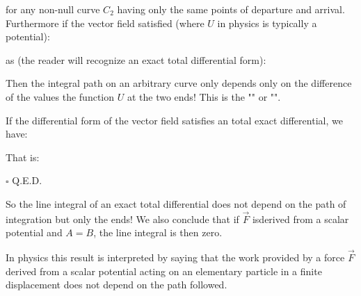 	for any non-null curve $C_2$ having only the same points of departure and arrival. Furthermore if the vector field satisfied (where $U$ in physics is typically a potential):
	
	as (the reader will recognize an exact total differential form):
	
	Then the integral path on an arbitrary curve only depends only on the difference of the values the function $U$ at the two ends! This is the "" or "".
	\begin{dem}
	If the differential form of the vector field satisfies an total exact differential, we have:
	
	That is:
	
	\begin{flushright}
		$\square$  Q.E.D.
	\end{flushright}
	\end{dem}
	So the line integral of an exact total differential does not depend on the path of integration but only the ends! We also conclude that if $\vec{F}$ isderived from a scalar potential and $A = B$, the line integral is then zero.
	
	In physics this result is interpreted by saying that the work provided by a force $\vec{F}$ derived from a scalar potential acting on an elementary particle in a finite displacement does not depend on the path followed.
	

